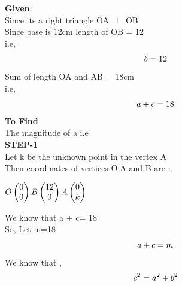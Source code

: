 \documentclass[10pt,a4paper]{report}
\begin{document}
\begin{multicols}{2}
\raggedright \textbf{Given}:\vspace{2mm}\\
Since its a right triangle OA $\perp$ OB \\\vspace{2mm}
Since base is 12cm length of OB = 12  \\i.e,\\
\begin{equation}
b= 12 \vspace{2mm}
\end{equation}
Sum of length OA and AB = 18cm \\ i.e,\\
\begin{equation}
a + c= 18 \vspace{2mm}
\end{equation}
\textbf{To Find}\vspace{2mm}\\
The magnitude of a \hspace{2mm} i.e \\ \vspace{2mm}
\textbf{STEP-1}\vspace{2mm}\\
Let k be the unknown point in the vertex A \vspace{2mm}\\
Then coordinates of vertices  O,A and B are :\vspace{2mm}\\
\begin{center}$
 O \begin{pmatrix}
0 \\
0 
\end{pmatrix} 
\vspace{1mm}
B\begin{pmatrix}
12 \\
0 
\end{pmatrix} 
\vspace{1mm}
A\begin{pmatrix}
0 \\
k 
\end{pmatrix} 
\vspace{1mm}$
\end{center}

\vspace{3mm} 
We know that a + c= 18 \vspace{2mm}\\
So, Let m=18 
\begin{equation}
   a +c = m \vspace{2mm}
\end{equation}
We know that , \\
\begin{equation}
c^2 = a^2 + b^2 \vspace{2mm}
\end{equation}


\end{multicols}
\end{document}
